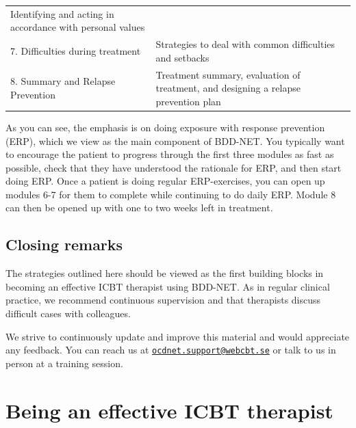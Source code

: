 \documentclass[]{book}
\theoremstyle{definition}
\theoremstyle{definition}
\theoremstyle{definition}
\theoremstyle{remark}
\begin{document}
\begin{longtable}[]{@{}ll@{}}
\begin{minipage}[t]{0.47\columnwidth}
Identifying and acting in accordance with personal values\strut
\end{minipage}\tabularnewline
\begin{minipage}[t]{0.47\columnwidth}\raggedright
7. Difficulties during treatment\strut
\end{minipage} & \begin{minipage}[t]{0.47\columnwidth}\raggedright
Strategies to deal with common difficulties and setbacks\strut
\end{minipage}\tabularnewline
\begin{minipage}[t]{0.47\columnwidth}\raggedright
8. Summary and Relapse Prevention\strut
\end{minipage} & \begin{minipage}[t]{0.47\columnwidth}\raggedright
Treatment summary, evaluation of treatment, and designing a relapse
prevention plan\strut
\end{minipage}\tabularnewline
\bottomrule
\end{longtable}

As you can see, the emphasis is on doing exposure with response
prevention (ERP), which we view as the main component of BDD-NET. You
typically want to encourage the patient to progress through the first
three modules as fast as possible, check that they have understood the
rationale for ERP, and then start doing ERP. Once a patient is doing
regular ERP-exercises, you can open up modules 6-7 for them to complete
while continuing to do daily ERP. Module 8 can then be opened up with
one to two weeks left in treatment.

\hypertarget{closing-remarks-1}{%
\section{Closing remarks}\label{closing-remarks-1}}

The strategies outlined here should be viewed as the first building
blocks in becoming an effective ICBT therapist using BDD-NET. As in
regular clinical practice, we recommend continuous supervision and that
therapists discuss difficult cases with colleagues.

We strive to continuously update and improve this material and would
appreciate any feedback. You can reach us at
\href{mailto:ocdnet.support@webcbt.se}{\nolinkurl{ocdnet.support@webcbt.se}}
or talk to us in person at a training session.

\hypertarget{being-an-effective-icbt-therapist}{%
\chapter{Being an effective ICBT
therapist}\label{being-an-effective-icbt-therapist}}
\end{document}
